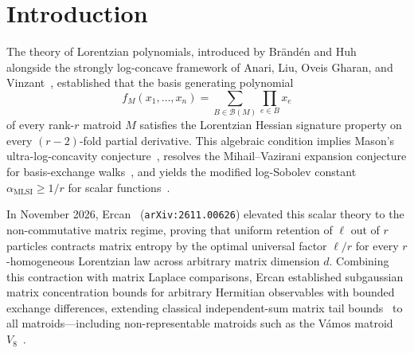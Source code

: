 \documentclass[11pt,a4paper]{article}
\theoremstyle{definition}
\theoremstyle{remark}
\begin{document}
\section{Introduction}

The theory of Lorentzian polynomials, introduced by Br\"and\'en and Huh~\cite{branden2020lorentzian} alongside the strongly log-concave framework of Anari, Liu, Oveis Gharan, and Vinzant~\cite{anari2019logconcave2}, established that the basis generating polynomial
\begin{equation}
  f_M(x_1,\dots,x_n) = \sum_{B \in \mathcal{B}(M)} \prod_{e \in B} x_e
\end{equation}
of every rank-$r$ matroid $M$ satisfies the Lorentzian Hessian signature property on every $(r-2)$-fold partial derivative. This algebraic condition implies Mason's ultra-log-concavity conjecture~\cite{mason1972matroids}, resolves the Mihail--Vazirani expansion conjecture for basis-exchange walks~\cite{feder1992balanced,anari2019logconcave2}, and yields the modified log-Sobolev constant $\alpha_{\mathrm{MLSI}} \ge 1/r$ for scalar functions~\cite{cryan2021modified}.

In November 2026, Ercan~\cite{ercan2026lorentzian} (\texttt{arXiv:2611.00626}) elevated this scalar theory to the non-commutative matrix regime, proving that uniform retention of $\ell$ out of $r$ particles contracts matrix entropy by the optimal universal factor $\ell/r$ for every $r$-homogeneous Lorentzian law across arbitrary matrix dimension $d$. Combining this contraction with matrix Laplace comparisons, Ercan established subgaussian matrix concentration bounds for arbitrary Hermitian observables with bounded exchange differences, extending classical independent-sum matrix tail bounds~\cite{tropp2012user} to all matroids---including non-representable matroids such as the V\'amos matroid $V_8$~\cite{oxley2011matroid}.
\end{document}
